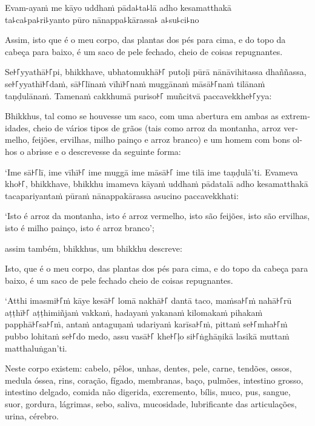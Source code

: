 Evam-ayaṁ me kāyo uddhaṁ pāda꜕ta꜕lā adho kesamatthakā\\
ta꜕ca꜕pa꜕ri꜕yanto pūro nānappa꜕kārassa꜕ a꜕su꜕ci꜕no

\begin{english}
  Assim, isto que é o meu corpo, das plantas dos pés para cima, e do topo da cabeça para baixo, é um saco de pele fechado, cheio de coisas repugnantes.
\end{english}

\clearpage

Se꜔꜒yyathā꜔꜒pi, bhikkhave, ubhatomukhā꜔꜒ putoḷi pūrā nānāvihitassa dhaññassa,
se꜔꜒yyathī꜔꜒daṁ, sā꜔꜒līnaṁ vīhī꜔꜒naṁ muggānaṁ māsā꜔꜒naṁ tilānaṁ taṇḍulānaṁ. Tamenaṁ
cakkhumā puriso꜔꜒ muñcitvā paccavekkhe꜔꜒yya:

\begin{english}
  Bhikkhus, tal como se houvesse um saco, com uma abertura em ambas as
  extremidades, cheio de vários tipos de grãos (tais como arroz da montanha,
  arroz vermelho, feijões, ervilhas, milho painço e arroz branco) e um homem com
  bons olhos o abrisse e o descrevesse da seguinte forma:
\end{english}

‘Ime sā꜔꜒lī, ime vīhī꜔꜒ ime muggā ime māsā꜔꜒ ime tilā ime taṇḍulā’ti. Evameva kho꜔꜒,
bhikkhave, bhikkhu imameva kāyaṁ uddhaṁ pādatalā adho kesamatthakā
tacapariyantaṁ pūraṁ nānappakārassa asucino paccavekkhati:

\begin{english}
  ‘Isto é arroz da montanha, isto é arroz vermelho, isto são feijões, isto são
  ervilhas, isto é milho painço, isto é arroz branco’;

  assim também, bhikkhus, um bhikkhu descreve:

  Isto, que é o meu corpo, das plantas dos pés para cima, e do topo da cabeça
  para baixo, é um saco de pele fechado cheio de coisas repugnantes.
\end{english}

‘Atthi imasmi꜔꜒ṁ kāye kesā꜔꜒ lomā nakhā꜔꜒ dantā taco, maṁsa꜔꜒ṁ nahā꜔꜒rū aṭṭhī꜔꜒ aṭṭhimiñjaṁ
vakkaṁ, hadayaṁ yakanaṁ kilomakaṁ pihakaṁ papphā꜔꜒sa꜔꜒ṁ, antaṁ antaguṇaṁ udariyaṁ
karīsa꜔꜒ṁ, pittaṁ se꜔꜒mha꜔꜒ṁ pubbo lohitaṁ se꜔꜒do medo, assu vasā꜔꜒ khe꜔꜒ḷo si꜔꜒ṅghāṇikā
lasikā muttaṁ matthaluṅgan’ti.

\begin{english}
  Neste corpo existem:
  cabelo, pêlos, unhas, dentes, pele,
  carne, tendões, ossos, medula óssea, rins,
  coração, fígado, membranas, baço, pulmões,
  intestino grosso, intestino delgado, comida não digerida, excremento,
  bílis, muco, pus, sangue, suor, gordura,
  lágrimas, sebo, saliva, mucosidade, lubrificante das articulações, urina, cérebro.
\end{english}

